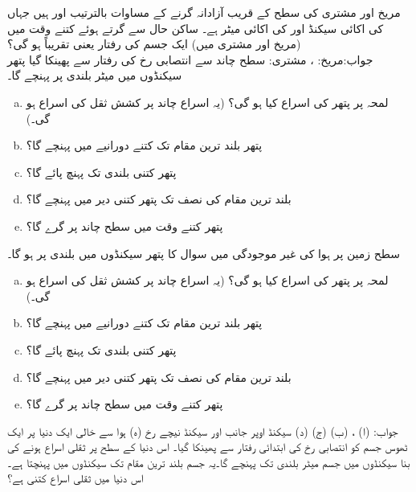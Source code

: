 مریخ اور مشتری کی سطح کے قریب آزادانہ گرنے کے مساوات بالترتیب  اور  ہیں جہاں  کی اکائی سیکنڈ اور  کی اکائی میٹر ہے۔ ساکن حال سے گرتے ہوئے کتنے وقت میں (مریخ اور مشتری میں) ایک جسم کی رفتار  یعنی تقریباً  ہو گی؟\\
جواب:\quad مریخ: ، مشتری: 
سطح چاند سے  انتصابی رخ  کی رفتار سے  پھینکا گیا پتھر  سیکنڈوں میں  میٹر بلندی پر پہنچے گا۔
\begin{enumerate}[a.]
\item
لمحہ  پر پتھر کی اسراع کیا ہو گی؟ (یہ اسراع چاند پر کشش ثقل کی اسراع ہو گی۔)
\item
پتھر بلند ترین مقام تک کتنے دورانیے میں پہنچے گا؟
\item
پتھر کتنی بلندی تک پہنچ پائے گا؟
\item
بلند ترین مقام کی نصف تک پتھر کتنی دیر میں پہنچے گا؟
\item
پتھر  کتنے وقت میں سطح چاند پر گرے گا؟ 
\end{enumerate}   
سطح زمین پر ہوا کی  غیر موجودگی میں سوال  کا پتھر  سیکنڈوں میں  بلندی پر ہو گا۔
\begin{enumerate}[a.]
\item
لمحہ  پر پتھر کی اسراع کیا ہو گی؟ (یہ اسراع چاند پر کشش ثقل کی اسراع ہو گی۔)
\item
پتھر بلند ترین مقام تک کتنے دورانیے میں پہنچے گا؟
\item
پتھر کتنی بلندی تک پہنچ پائے گا؟
\item
بلند ترین مقام کی نصف تک پتھر کتنی دیر میں پہنچے گا؟
\item
پتھر  کتنے وقت میں سطح چاند پر گرے گا؟ 
\end{enumerate}   
جواب:\quad
(ا) ،  (ب)  (ج)  (د)  سیکنڈ اوپر جانب اور  سیکنڈ نیچے رخ (ہ)  
ہوا سے خالی ایک دنیا پر ایک ٹھوس جسم کو انتصابی رخ  کی ابتدائی رفتار سے پھینکا گیا۔ اس دنیا کے سطح پر ثقلی اسراع   ہونے کی بنا  سیکنڈوں میں جسم   میٹر بلندی تک پہنچے گا۔یہ جسم بلند ترین مقام تک  سیکنڈوں میں پہنچتا ہے۔ اس دنیا میں ثقلی اسراع کتنی ہے؟
